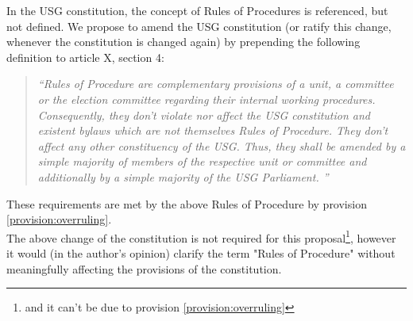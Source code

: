 In the USG constitution, the concept of Rules of Procedures is referenced, but not defined. 
We propose to amend the USG constitution (or ratify this change, whenever the constitution is changed again) by prepending the following definition to article X, section 4:

\begin{quote}\emph{
	``Rules of Procedure are complementary provisions of a unit, a committee or the election committee regarding their internal working procedures. Consequently, they don't violate nor affect the USG constitution and existent bylaws which are not themselves Rules of Procedure. They don't affect any other constituency of the USG. 
	Thus, they shall be amended by a simple majority of members of the respective unit or committee and additionally by a simple majority of the USG Parliament.
	''} %
\end{quote}
These requirements are met by the above Rules of Procedure by provision \ref{provision:overruling}.\\

The above change of the constitution is not required for this proposal\protect\footnote{and it can't be due to provision \ref{provision:overruling}}, however it would (in the author's opinion) clarify the term "Rules of Procedure" without meaningfully affecting the provisions of the constitution. 